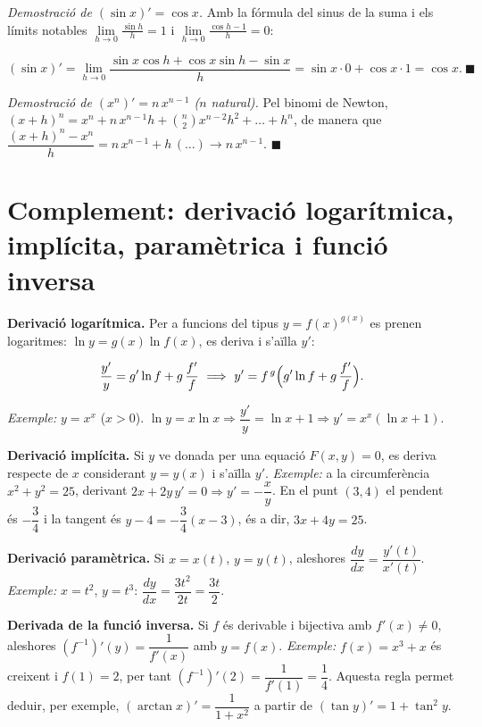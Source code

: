 \emph{Demostració de $(\sin x)'=\cos x$.} Amb la fórmula del sinus de la suma i els límits notables $\lim\limits_{h\to0}\frac{\sin h}{h}=1$ i $\lim\limits_{h\to0}\frac{\cos h-1}{h}=0$:

\begin{equation*}
(\sin x)'=\lim_{h\to0}\frac{\sin x\cos h+\cos x\sin h-\sin x}{h}=\sin x\cdot0+\cos x\cdot1=\cos x.\ \blacksquare
\end{equation*}

\emph{Demostració de $(x^n)'=n\,x^{n-1}$ ($n$ natural).} Pel binomi de Newton, $(x+h)^n=x^n+n\,x^{n-1}h+\binom n2x^{n-2}h^2+\dots+h^n$, de manera que $\dfrac{(x+h)^n-x^n}{h}=n\,x^{n-1}+h\,(\dots)\to n\,x^{n-1}$. $\blacksquare$

\section{Complement: derivació logarítmica, implícita, paramètrica i funció inversa}

\textbf{Derivació logarítmica.} Per a funcions del tipus $y=f(x)^{g(x)}$ es prenen logaritmes: $\ln y=g(x)\ln f(x)$, es deriva i s'aïlla $y'$:

\begin{equation*}
\frac{y'}{y}=g'\ln f+g\,\frac{f'}{f}\ \Longrightarrow\ y'=f^{\,g}\Bigl(g'\ln f+g\,\frac{f'}{f}\Bigr).
\end{equation*}

\emph{Exemple:} $y=x^{x}$ ($x>0$). $\ln y=x\ln x\Rightarrow\dfrac{y'}{y}=\ln x+1\Rightarrow y'=x^{x}(\ln x+1)$.

\textbf{Derivació implícita.} Si $y$ ve donada per una equació $F(x,y)=0$, es deriva respecte de $x$ considerant $y=y(x)$ i s'aïlla $y'$. \emph{Exemple:} a la circumferència $x^2+y^2=25$, derivant $2x+2y\,y'=0\Rightarrow y'=-\dfrac xy$. En el punt $(3,4)$ el pendent és $-\dfrac34$ i la tangent és $y-4=-\dfrac34(x-3)$, és a dir, $3x+4y=25$.

\textbf{Derivació paramètrica.} Si $x=x(t)$, $y=y(t)$, aleshores $\dfrac{dy}{dx}=\dfrac{y'(t)}{x'(t)}$. \emph{Exemple:} $x=t^2$, $y=t^3$: $\dfrac{dy}{dx}=\dfrac{3t^2}{2t}=\dfrac{3t}{2}$.

\textbf{Derivada de la funció inversa.} Si $f$ és derivable i bijectiva amb $f'(x)\neq0$, aleshores $(f^{-1})'(y)=\dfrac{1}{f'(x)}$ amb $y=f(x)$. \emph{Exemple:} $f(x)=x^3+x$ és creixent i $f(1)=2$, per tant $(f^{-1})'(2)=\dfrac{1}{f'(1)}=\dfrac14$. Aquesta regla permet deduir, per exemple, $(\arctan x)'=\dfrac{1}{1+x^2}$ a partir de $(\tan y)'=1+\tan^2y$.

